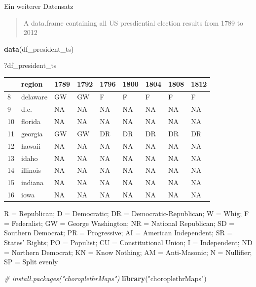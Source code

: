 \documentclass[ignorenonframetext,]{beamer}
\newenvironment{Shaded}{\begin{snugshade}}{\end{snugshade}}
\newcommand{\CommentTok}[1]{\textcolor[rgb]{0.56,0.35,0.01}{\textit{#1}}}
\newcommand{\KeywordTok}[1]{\textcolor[rgb]{0.13,0.29,0.53}{\textbf{#1}}}
\newcommand{\NormalTok}[1]{#1}
\newcommand{\StringTok}[1]{\textcolor[rgb]{0.31,0.60,0.02}{#1}}
\begin{document}
\begin{frame}[fragile]{Ein weiterer Datensatz}
\protect\hypertarget{ein-weiterer-datensatz}{}

\begin{quote}
A data.frame containing all US presdiential election results from 1789
to 2012
\end{quote}

\begin{Shaded}
\begin{Highlighting}[]
\KeywordTok{data}\NormalTok{(df_president_ts)}
\end{Highlighting}
\end{Shaded}

\begin{Shaded}
\begin{Highlighting}[]
\NormalTok{?df_president_ts}
\end{Highlighting}
\end{Shaded}

\begin{longtable}[]{@{}lllllllll@{}}
\toprule
& region & 1789 & 1792 & 1796 & 1800 & 1804 & 1808 & 1812\tabularnewline
\midrule
\endhead
8 & delaware & GW & GW & F & F & F & F & F\tabularnewline
9 & d.c. & NA & NA & NA & NA & NA & NA & NA\tabularnewline
10 & florida & NA & NA & NA & NA & NA & NA & NA\tabularnewline
11 & georgia & GW & GW & DR & DR & DR & DR & DR\tabularnewline
12 & hawaii & NA & NA & NA & NA & NA & NA & NA\tabularnewline
13 & idaho & NA & NA & NA & NA & NA & NA & NA\tabularnewline
14 & illinois & NA & NA & NA & NA & NA & NA & NA\tabularnewline
15 & indiana & NA & NA & NA & NA & NA & NA & NA\tabularnewline
16 & iowa & NA & NA & NA & NA & NA & NA & NA\tabularnewline
\bottomrule
\end{longtable}

R = Republican; D = Democratic; DR = Democratic-Republican; W = Whig; F
= Federalist; GW = George Washington; NR = National Republican; SD =
Southern Democrat; PR = Progressive; AI = American Independent; SR =
States' Rights; PO = Populist; CU = Constitutional Union; I =
Independent; ND = Northern Democrat; KN = Know Nothing; AM =
Anti-Masonic; N = Nullifier; SP = Split evenly

\begin{Shaded}
\begin{Highlighting}[]
\CommentTok{# install.packages("choroplethrMaps")}
\KeywordTok{library}\NormalTok{(}\StringTok{"choroplethrMaps"}\NormalTok{)}
\end{Highlighting}
\end{Shaded}

\end{frame}
\end{document}
